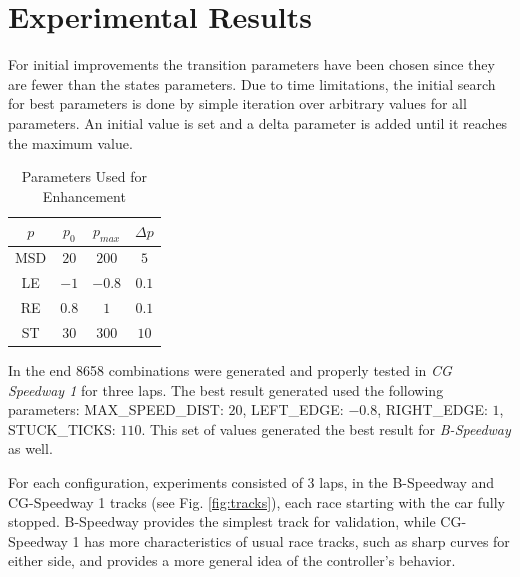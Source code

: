 \section{Experimental Results}
For initial improvements the transition parameters have been chosen since they are fewer than the states parameters. Due to time limitations, the initial search for best parameters is done by simple
iteration over arbitrary values for all parameters. An initial value is set and a delta parameter is added until it reaches the maximum value.


\begin{table}[h]
\renewcommand{\arraystretch}{1.3}
\caption{Parameters Used for Enhancement}
\label{parameter_table}
\centering
\begin{tabular}{c||c||c||c}
\hline \bfseries $p$ &\bfseries $p_0$ &\bfseries $ p_{max}$ &\bfseries $\Delta p$ \\
\hline
\hline MSD & $20$ & $200$ & $5$ \\ 
\hline LE & $-1$ & $-0.8$ & $0.1$ \\ 
\hline RE & $0.8$ & $1$ & $0.1$ \\ 
\hline ST & $30$ & $300$ & $10$ \\ 
\hline 
\end{tabular} 
\end{table}

In the end 8658 combinations were generated and properly tested in \textit{CG Speedway 1}
for three laps. The best result generated used the following parameters: MAX\_SPEED\_DIST: $20$, LEFT\_EDGE: $-0.8$, RIGHT\_EDGE: $1$, STUCK\_TICKS: $110$. This set of values generated the best result for \textit{B-Speedway} as well.






For each configuration, experiments consisted of 3 laps, in the B-Speedway and 
CG-Speedway 1 tracks (see Fig. \ref{fig:tracks}), each race starting with the car fully stopped. B-Speedway provides the simplest track for validation, while CG-Speedway 1
has more characteristics of usual race tracks, such as sharp curves for either side,
and provides a more general idea of the controller's behavior.

